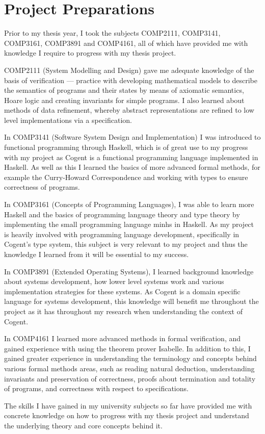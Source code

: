 \chapter{Project Preparations}\label{ch:conclusion}

Prior to my thesis year, I took the subjects COMP2111, COMP3141, COMP3161, COMP3891 and COMP4161,
all of which have provided me with knowledge I require to progress with my thesis project.

COMP2111 (System Modelling and Design) gave me adequate knowledge of the basis of verification 
--- practice with developing
mathematical models to describe the semantics of programs and their states by means of 
axiomatic semantics, Hoare logic and creating invariants for simple programs. I also 
learned about methods of data refinement, whereby abstract representations are refined to low
level implementations via a specification.

In COMP3141 (Software System Design and Implementation) I was introduced to functional 
programming through Haskell, which is of great
use to my progress with my project as Cogent is a functional programming language implemented in Haskell.
As well as this I learned the basics of more advanced formal methods, for example the Curry-Howard
Correspondence and working with types to ensure correctness of programs.

In COMP3161 (Concepts of Programming Languages), I was able to learn more Haskell and the
basics of programming language theory and type theory by implementing the small programming 
language minhs in Haskell. As my project is heavily involved with programming language development,
specifically in Cogent's type system, this subject is very relevant to my project and thus the knowledge
I learned from it will be essential to my success.

In COMP3891 (Extended Operating Systems), I learned background knowledge about systems development,
how lower level systems work and various implementation strategies for these systems. As Cogent
is a domain specific language for systems development, this knowledge will benefit me throughout
the project as it has throughout my research when understanding the context of Cogent.

In COMP4161 I learned more advanced methods in formal verification, and gained experience with using
the theorem prover Isabelle. In addition to this, I gained greater experience in understanding the 
terminology and concepts behind various formal methods areas, such as reading natural deduction,
understanding invariants and preservation of correctness, proofs about termination and totality
of programs, and correctness with respect to specifications.

The skills I have gained in my university subjects so far have provided me with concrete knowledge on
how to progress with my thesis project and understand the underlying theory and core concepts behind
it.